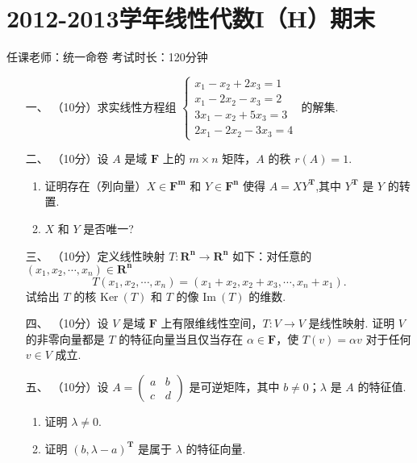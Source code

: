 \section*{2012-2013学年线性代数I（H）期末}

\begin{center}
    任课老师：统一命卷\hspace{4em} 考试时长：120分钟
\end{center}

\begin{enumerate}
    \item [一、]（10分）求实线性方程组 $\begin{cases}x_1-x_2+2x_3 = 1 \\ x_1-2x_2-x_3=2 \\ 3x_1-x_2+5x_3=3 \\ 2x_1-2x_2-3x_3 = 4\end{cases}$ 的解集.
    \item [二、]（10分）设 $A$ 是域 $\mathbf{F}$ 上的 $m\times n$ 矩阵，$A$ 的秩 $r(A)=1.$
    \begin{enumerate}[label=(\arabic*)]
        \item 证明存在（列向量）$X\in \mathbf{F^m}$ 和 $Y\in \mathbf{F^n}$ 使得 $A=XY^\mathbf{T}$,其中 $Y^\mathbf{T}$ 是 $Y$ 的转置.
        \item $X$ 和 $Y$ 是否唯一?
    \end{enumerate}
    \item [三、]（10分）定义线性映射 $T:\mathbf{R^n} \to \mathbf{R^n}$ 如下：对任意的 $(x_1,x_2,\cdots,x_n) \in \mathbf{R^n}$
    \[T(x_1,x_2,\cdots,x_n)=(x_1+x_2,x_2+x_3,\cdots,x_n+x_1).\]
    试给出 $T$ 的核 $\mathrm{Ker} \ (T)$ 和 $T$ 的像 $\mathrm{Im} \ (T)$ 的维数.
    \item [四、]（10分）设 $V$ 是域 $\mathbf{F}$ 上有限维线性空间，$T:V\to V$ 是线性映射. 证明 $V$ 的非零向量都是 $T$ 的特征向量当且仅当存在 $\alpha \in \mathbf{F}$，使 $T(v)=\alpha v$ 对于任何 $v \in V$ 成立.
    \item [五、]（10分）设 $A=\begin{pmatrix}a & b \\ c & d\end{pmatrix}$ 是可逆矩阵，其中 $b\neq 0$；$\lambda$ 是 $A$ 的特征值.
    \begin{enumerate}[label=(\arabic*)]
        \item 证明 $\lambda \neq 0.$
        \item 证明 $(b,\lambda-a)^\mathbf{T}$ 是属于 $\lambda$ 的特征向量.

\end{enumerate}
\end{enumerate}
